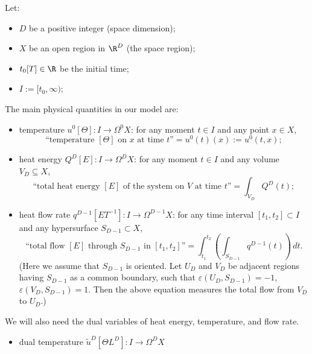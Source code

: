 \begin{discussion}
  \label{cmc/diffusion/continuous/model_with_differential_forms-discussion}
  Let:
  \begin{itemize}
    \item
      $D$ be a positive integer (space dimension);
    \item
      $X$ be an open region in $\R^D$ (the space region);
    \item
      $t_0 [T] \in \R$ be the initial time;
    \item
      $I := [t_0, \infty)$;
  \end{itemize}
  The main physical quantities in our model are:
  \begin{itemize}
    \item
      temperature $u^0 [\Theta] \colon I \to \Omega^0 X$:
      for any moment $t \in I$ and any point $x \in X$,
      \begin{equation}
        \text{``temperature $[\Theta]$ on $x$ at time $t$''}
        = u^0(t)(x) := u^0(t, x);
      \end{equation}
    \item
      heat energy $Q^D [E] \colon I \to \Omega^D X$:
      for any moment $t \in I$ and any volume $V_D \subseteq X$,
      \begin{equation}
        \text{``total heat energy $[E]$ of the system on $V$ at time $t$''}
        = \int_{V_D} Q^D(t);
      \end{equation}
    \item
      heat flow rate $q^{D - 1} [E T^{-1}] \colon I \to \Omega^{D - 1} X$:
      for any time interval $[t_1, t_2] \subset I$
      and any hypersurface $S_{D - 1} \subset X$,
      \begin{equation}
        \text{``total flow $[E]$ through $S_{D - 1}$ in $[t_1, t_2]$''}
        = \int_{t_1}^{t_2}\left(\int_{S_{D - 1}} q^{D - 1}(t)\right)\, d t.
      \end{equation}
      (Here we assume that $S_{D - 1}$ is oriented.
       Let $U_D$ and $V_D$ be adjacent regions having $S_{D - 1}$ as a common
       boundary, such that $\varepsilon(U_D, S_{D - 1}) = -1$,
       $\varepsilon(V_D, S_{D - 1}) = 1$.
       Then the above equation measures the total flow from $V_D$ to $U_D$.)
  \end{itemize}
  We will also need the dual variables of heat energy, temperature, and
  flow rate.
  \begin{itemize}
    \item
      dual temperature $\tilde{u}^D [\Theta L^D] \colon I \to \Omega^D X$

\end{itemize}
\end{discussion}
